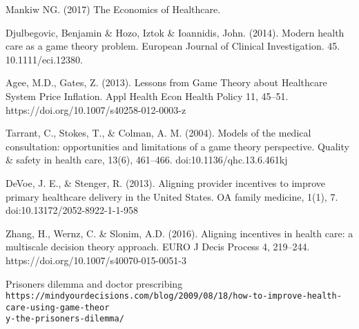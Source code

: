 \documentclass{article}
\begin{document}
\begin{thebibliography}{9}

Mankiw NG. (2017) The Economics of Healthcare.
 
Djulbegovic, Benjamin \& Hozo, Iztok \& Ioannidis, John. (2014). Modern health care as a game theory problem. European Journal of Clinical Investigation. 45. 10.1111/eci.12380.

Agee, M.D., Gates, Z. (2013). Lessons from Game Theory about Healthcare System Price Inflation. Appl Health Econ Health Policy 11, 45–51. https://doi.org/10.1007/s40258-012-0003-z

Tarrant, C., Stokes, T., \& Colman, A. M. (2004). Models of the medical consultation: opportunities and limitations of a game theory perspective. Quality \& safety in health care, 13(6), 461–466. doi:10.1136/qhc.13.6.461kj

DeVoe, J. E., \& Stenger, R. (2013). Aligning provider incentives to improve primary healthcare delivery in the United States. OA family medicine, 1(1), 7. doi:10.13172/2052-8922-1-1-958
 
Zhang, H., Wernz, C. \& Slonim, A.D. (2016). Aligning incentives in health care: a multiscale decision theory approach. EURO J Decis Process 4, 219–244. https://doi.org/10.1007/s40070-015-0051-3

Prisoners dilemma and doctor prescribing
\\\texttt{https://mindyourdecisions.com/blog/2009/08/18/how-to-improve-health-care-using-game-theor\\y-the-prisoners-dilemma/}
\end{thebibliography}

\end{document}
